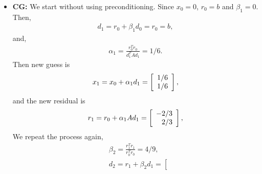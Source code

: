 \begin{questions}

\begin{solution}
\begin{itemize}
\item \textbf{CG:}
We start without using preconditioning. Since $x_0=0$, $r_0=b$ and $\beta_1=0$. Then,
\begin{align*}
d_1=r_0+\beta_1d_0=r_0=b,
\end{align*}
and,
\begin{align*}
\alpha_1=\frac{r_0^Tr_0}{d_1^TAd_1}=1/6.
\end{align*}
Then new guess is
\begin{align*}
x_1=x_0+\alpha_1d_1=\left[
	\begin{array}{r r} 
	1/6 \\
	1/6 \\
	\end{array} \right],
\end{align*}
and the new residual is
\begin{align*}
r_1=r_0+\alpha_1Ad_1=\left[
	\begin{array}{r r} 
	-2/3 \\
	2/3 \\
	\end{array} \right],
\end{align*}
We repeat the process again,
\begin{align*}
&\beta_2=\frac{r_1^Tr_1}{r_0^Tr_0}=4/9,\\
&d_2=r_1+\beta_2d_1=\left[

\end{align*}
\end{itemize}
\end{solution}
\end{questions}
